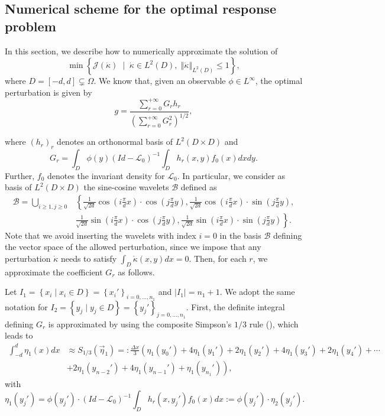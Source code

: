 \documentclass{amsart}
\newcommand{\norm}[1]{\left\Vert#1\right\Vert}
\begin{document}
\subsection{Numerical scheme for the optimal response problem}
\label{sec: numerical scheme optimal problem}
In this section, we describe how to numerically approximate the solution of
\begin{equation}
\min \left \lbrace \mathcal{J}(\Dot{\kappa}) \; \mid \; \dot \kappa \in L^2 (D),\;  \norm{{\dot \kappa}}_{L^2(D)}  \leq 1\right \rbrace,
\label{eq: optimal problem}
\end{equation}
where $D = [-d,d] \subsetneq \Omega$. We know that, given an observable $\phi \in L^\infty$, the optimal perturbation is given by
$$
g = \frac{\sum_{r=0}^{+\infty} G_r h_r}{\left(\sum_{r = 0}^{+\infty} G_r^2 \right)^{1/2}},
$$

where $(h_r)_r$ denotes an orthonormal basis of $L^2(D\times D)$ and
$$
G_r = \int_D \phi(y) (Id- \mathcal{L}_0)^{-1} \int_D h_r(x,y) f_0(x) dx dy.
$$
Further, $f_0$ denotes the invariant density for $\mathcal{L}_0$. In particular, we consider as basis of $L^2(D \times D)$ the sine-cosine wavelets $\mathcal{B}$ defined as
\begin{equation*}
    \begin{split}
        \mathcal{B} = \bigcup_{i\geq 1, j \geq 0} & \left \lbrace 
\frac{1}{\sqrt{2d}} \cos( i \frac{\pi }{d}x) \cdot \cos (j \frac{\pi}{d}y), \frac{1}{\sqrt{2d}} \cos( i \frac{\pi }{d}x) \cdot \sin (j \frac{\pi}{d}y), \right. \\
& \left. \frac{1}{\sqrt{2d}} \sin( i \frac{\pi }{d}x) \cdot \cos (j \frac{\pi}{d}y), \frac{1}{\sqrt{2d}} \sin( i \frac{\pi }{d}x) \cdot \sin (j \frac{\pi}{d}y)
\right \rbrace .
\end{split}
\end{equation*}
Note that we avoid inserting the wavelets with index $i=0$ in the basis $\mathcal{B}$ defining the vector space of the allowed perturbation, since we impose that any perturbation $\dot \kappa$ needs to satisfy $\int_D \dot \kappa(x,y) dx = 0$. Then, for each $r$, we approximate the coefficient $G_r$ as follows.

Let $I_1 = \left \lbrace x_i \mid x_i \in D \right \rbrace = \left \lbrace x_i'
 \right \rbrace_{i=0,...,n_1}$ and $ \vert I_1 \vert = n_1 +1$. We adopt the same notation for $I_2 = \left \lbrace y_j \mid y_j \in D \right \rbrace = \left \lbrace y_j'
 \right \rbrace_{j=0,...,n_1}$. First, the definite integral defining $G_r$ is approximated by using the composite Simpson's $1/3$ rule (\cite{Quarteroni2007}), which leads to
\begin{equation}
    \begin{split}
        \int_{-d}^d \eta_1(x) dx &\approx  S_{1/3}(\Vec{\eta}_1) =: \frac{\Delta x}{3} \left( \eta_1(y_0') + 4 \eta_1(y_1') + 2\eta_1(y_2') + 4 \eta_1(y_3') +2\eta_1(y_4')+\cdots \right. \\
        &\left.
        +2 \eta_1(y_{n-2}') + 4 \eta_1(y_{n-1}') + \eta_1(y_{n_{1}}') \right),
    \end{split}
\end{equation}
with 
$$
\eta_1(y_j ') =\phi(y_j') \cdot (Id- \mathcal{L}_0)^{-1} \int_D h_r(x,y_j')f_0(x) dx :=\phi(y_j') \cdot \eta_2(y_j').
$$
\end{document}
